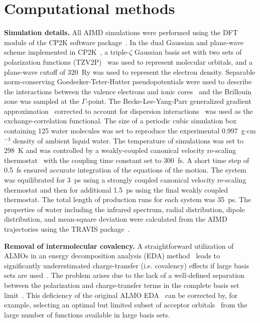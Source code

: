 \documentclass[10pt,amsmath,twocolumn,aps,prl,superscriptaddress,floatfix]{revtex4-1}
\begin{document}
\section{Computational methods}

\textbf{Simulation details.} All AIMD simulations were performed using the DFT module of the CP2K software package~\cite{www:cp2k}. 
In the dual Gaussian and plane-wave scheme implemented in CP2K~\cite{hutter2014cp2k}, a triple-$\zeta$ Gaussian basis set with two sets of polarization functions (TZV2P)~\cite{vandevondele2007gaussian} was used to represent molecular orbitals, and a plane-wave cutoff of 320~Ry was used to represent the electron density. 
Separable norm-conserving Goedecker-Teter-Hutter pseudopotentials were used to describe the interactions between the valence electrons and ionic cores~\cite{goedecker1996separable,krack2005pseudopotentials} and the Brillouin zone was sampled at the $\Gamma$-point. 
The Becke-Lee-Yang-Parr generalized gradient approximation~\cite{becke1988density, lee1988development} corrected to account for dispersion interactions~\cite{grimme2010consistent} was used as the exchange-correlation functional. 
The size of a periodic cubic simulation box containing 125 water molecules was set to reproduce the experimental 0.997~g$\cdot$cm$^{-3}$ density of ambient liquid water. 
The temperature of simulations was set to 298~K and was controlled by a weakly-coupled canonical velocity re-scaling thermostat~\cite{bussi2007canonical} with the coupling time constant set to 300~fs. 
A short time step of 0.5~fs ensured accurate integration of the equations of the motion. 
The system was equilibrated for 3~ps using a strongly coupled canonical velocity re-scaling thermostat and then for additional 1.5~ps using the final weakly coupled thermostat. 
The total length of production runs for each system was 35~ps. 
The properties of water including the infrared spectrum, radial distribution, dipole distribution, and mean-square deviation were calculated from the AIMD trajectories using the TRAVIS package~\cite{brehm2012travis}.  

\textbf{Removal of intermolecular covalency.} A straightforward utilization of ALMOs in an energy decomposition analysis (EDA) method~\cite{khaliullin2007unravelling} leads to significantly underestimated charge-transfer (i.e. covalency) effects if large basis sets are used~\cite{horn2015polarization,lao2016energy}. 
The problem arises due to the lack of a well-defined separation between the polarization and charge-transfer terms in the complete basis set limit~\cite{misquitta2013charge,horn2015polarization}. 
This deficiency of the original ALMO EDA~\cite{khaliullin2007unravelling} can be corrected by, for example, selecting an optimal but limited subset of acceptor orbitals~\cite{horn2015polarization} from the large number of functions available in large basis sets. 
\end{document}
